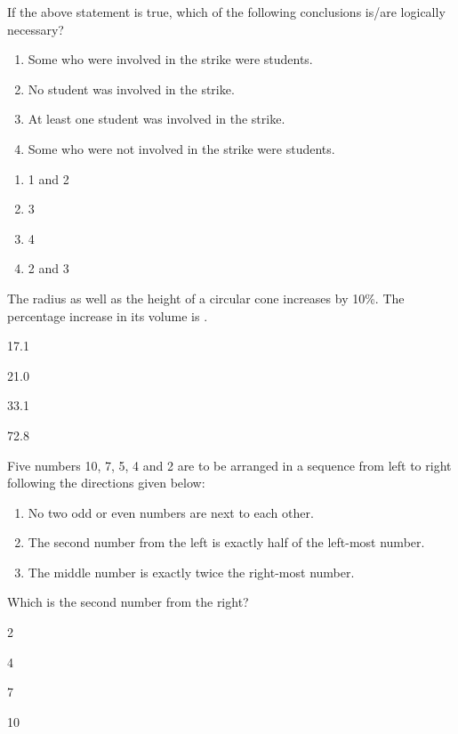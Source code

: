 If the above statement is true, which of the following conclusions is/are logically necessary?
\begin{enumerate}[label=\arabic*.]
\item Some who were involved in the strike were students.
\item No student was involved in the strike.
\item At least one student was involved in the strike.
\item Some who were not involved in the strike were students.
\end{enumerate}
\begin{enumerate}
\item 1 and 2
\item 3
\item 4
\item 2 and 3
\end{enumerate}
\item The radius as well as the height of a circular cone increases by 10\%. The percentage increase in its volume is .\underline{\hspace{1cm}}
\begin{enumerate}
\begin{multicols}{4}
\item 17.1
\item 21.0
\item 33.1
\item 72.8
\end{multicols}
\end{enumerate}
\item Five numbers 10, 7, 5, 4 and 2 are to be arranged in a sequence from left to right following 
the directions given below:
\begin{enumerate}[label=\arabic*.]
\item No two odd or even numbers are next to each other.
\item The second number from the left is exactly half of the left-most number.
\item The middle number is exactly twice the right-most number.
\end{enumerate}
Which is the second number from the right?
\begin{enumerate}
\begin{multicols}{4}
\item 2
\item 4
\item 7
\item 10
\end{multicols}
\end{enumerate}
